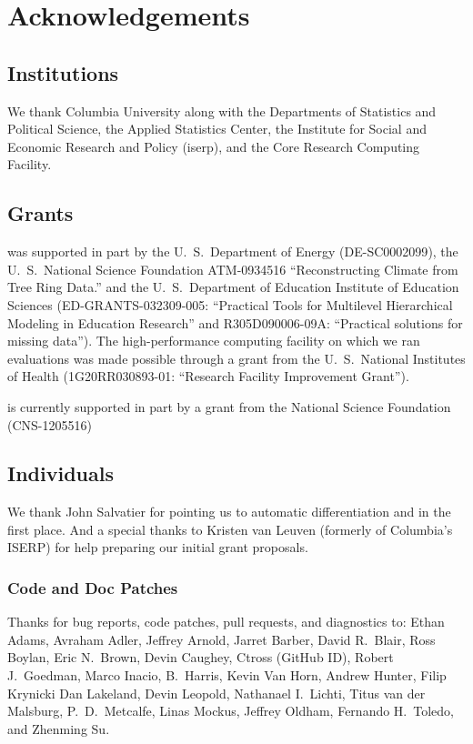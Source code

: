 \chapter*{Acknowledgements}

\section*{Institutions}

We thank Columbia University along with the Departments of
Statistics and Political Science, the Applied Statistics Center, the
Institute for Social and Economic Research and Policy ({\sc iserp}),
and the Core Research Computing Facility.

\section*{Grants}

\Stan was supported in part by 
%
the U.~S.\ Department of Energy 
({\small DE-SC0002099}), 
%
the U.~S.\ National Science Foundation 
{\small ATM-0934516}
``Reconstructing Climate from Tree Ring Data.''
and 
%
the U.~S.\ Department of Education Institute of Education Sciences 
({\small ED-GRANTS-032309-005}:
 ``Practical Tools for Multilevel Hierarchical Modeling in Education
 Research'' and
 {\small R305D090006-09A}:
 ``Practical solutions for missing data'').
%
The high-performance computing
facility on which we ran evaluations was made possible through 
a grant from the U.~S.\ National Institutes of Health 
({\small 1G20RR030893-01}:
 ``Research Facility Improvement Grant'').

\Stan is currently supported in part by a grant from the National
Science Foundation (CNS-1205516)

\section*{Individuals}

We thank John Salvatier for pointing us to automatic differentiation
and \HMC in the first place.  And a special thanks to Kristen van
Leuven (formerly of Columbia's ISERP) for help preparing our initial
grant proposals.

\subsection*{Code  and Doc Patches}

Thanks for bug reports, code patches, pull requests, and diagnostics
to: 
Ethan Adams, 
Avraham Adler,
Jeffrey Arnold, 
Jarret Barber, 
David R.~Blair, 
Ross Boylan, 
Eric N.~Brown, 
Devin Caughey, 
Ctross (GitHub ID), 
Robert J.\ Goedman, 
Marco Inacio, 
B.~Harris, 
Kevin Van Horn, 
Andrew Hunter, 
Filip Krynicki
Dan Lakeland, 
Devin Leopold, 
Nathanael I.~Lichti,
Titus van der Malsburg,
P.~D.~Metcalfe, 
Linas Mockus,
Jeffrey Oldham, 
Fernando H.~Toledo, 
and Zhenming Su.

